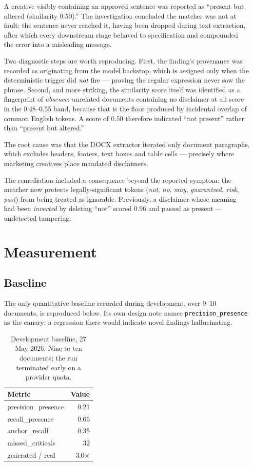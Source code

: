 \documentclass[10pt]{article}
\newcommand{\code}[1]{\texttt{\small #1}}
\begin{document}
A creative visibly containing an approved sentence was reported as ``present
but altered (similarity 0.50).'' The investigation concluded the matcher was
not at fault: the sentence never reached it, having been dropped during text
extraction, after which every downstream stage behaved to specification and
compounded the error into a misleading message.

Two diagnostic steps are worth reproducing. First, the finding's provenance was
recorded as originating from the model backstop, which is assigned only when
the deterministic trigger did \emph{not} fire --- proving the regular
expression never saw the phrase. Second, and more striking, the similarity
score itself was identified as a fingerprint of \emph{absence}: unrelated
documents containing no disclaimer at all score in the 0.48--0.55 band, because
that is the floor produced by incidental overlap of common English tokens. A
score of 0.50 therefore indicated ``not present'' rather than ``present but
altered.''

The root cause was that the DOCX extractor iterated only document paragraphs,
which excludes headers, footers, text boxes and table cells --- precisely where
marketing creatives place mandated disclaimers.

The remediation included a consequence beyond the reported symptom: the matcher
now protects legally-significant tokens (\emph{not}, \emph{no}, \emph{may},
\emph{guaranteed}, \emph{risk}, \emph{past}) from being treated as ignorable.
Previously, a disclaimer whose meaning had been \emph{inverted} by deleting
``not'' scored 0.96 and passed as present --- undetected tampering.

\section{Measurement}
\label{sec:measurement}
\label{sec:evaluation}

\subsection{Baseline}

The only quantitative baseline recorded during development, over 9--10
documents, is reproduced below. Its own design note names
\code{precision\_presence} as the canary: a regression there would indicate
novel findings hallucinating.

\begin{table}[htbp]
\centering
\caption{Development baseline, 27 May 2026. Nine to ten documents; the
run terminated early on a provider quota.}
\label{tab:baseline}
\begin{tabular}{@{}lr@{}}
\toprule
\textbf{Metric} & \textbf{Value} \\
\midrule
precision\_presence & 0.21 \\
recall\_presence    & 0.66 \\
anchor\_recall      & 0.35 \\
missed\_criticals   & 32 \\
generated / real    & 3.0$\times$ \\
\bottomrule
\end{tabular}
\end{table}
\end{document}

